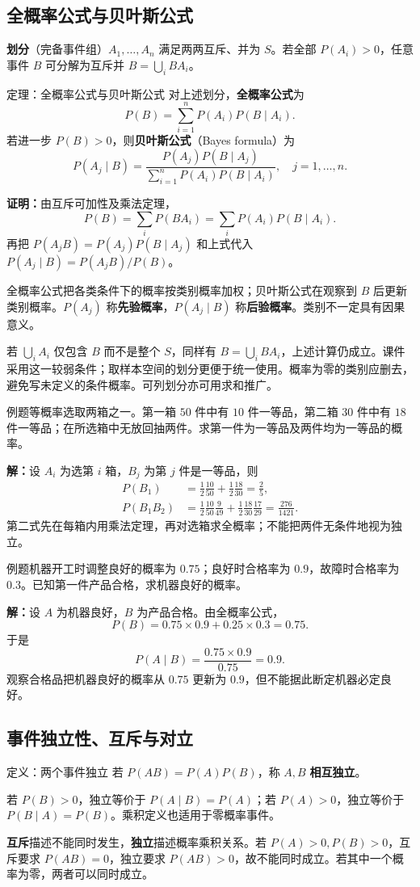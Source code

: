 \documentclass[UTF8,fontset=none,zihao=-4,a4paper]{ctexart}
\newcommand{\term}[1]{\textbf{#1}}
\newcommand{\example}[1]{\begin{infobox}{例题}#1\end{infobox}}
\newcommand{\solution}{\par\noindent\textbf{解：}}
\newcommand{\proof}{\par\noindent\textbf{证明：}}
\begin{document}
\subsection{全概率公式与贝叶斯公式}
\term{划分}（完备事件组）$A_1,\ldots,A_n$ 满足两两互斥、并为 $S$。若全部 $P(A_i)>0$，任意事件 $B$ 可分解为互斥并 $B=\bigcup_i BA_i$。
\begin{infobox}{定理：全概率公式与贝叶斯公式}
对上述划分，\term{全概率公式}为
\[
P(B)=\sum_{i=1}^n P(A_i)P(B\mid A_i).
\]
若进一步 $P(B)>0$，则\term{贝叶斯公式}（Bayes formula）为
\[
P(A_j\mid B)=\frac{P(A_j)P(B\mid A_j)}{\sum_{i=1}^n P(A_i)P(B\mid A_i)},\quad j=1,\ldots,n.
\]
\end{infobox}
\proof 由互斥可加性及乘法定理，
\[
P(B)=\sum_i P(BA_i)=\sum_i P(A_i)P(B\mid A_i).
\]
再把 $P(A_jB)=P(A_j)P(B\mid A_j)$ 和上式代入 $P(A_j\mid B)=P(A_jB)/P(B)$。

全概率公式把各类条件下的概率按类别概率加权；贝叶斯公式在观察到 $B$ 后更新类别概率。$P(A_j)$ 称\term{先验概率}，$P(A_j\mid B)$ 称\term{后验概率}。类别不一定具有因果意义。

若 $\bigcup_i A_i$ 仅包含 $B$ 而不是整个 $S$，同样有 $B=\bigcup_i BA_i$，上述计算仍成立。课件采用这一较弱条件；取样本空间的划分更便于统一使用。概率为零的类别应删去，避免写未定义的条件概率。可列划分亦可用求和推广。
\example{等概率选取两箱之一。第一箱 $50$ 件中有 $10$ 件一等品，第二箱 $30$ 件中有 $18$ 件一等品；在所选箱中无放回抽两件。求第一件为一等品及两件均为一等品的概率。}
\solution 设 $A_i$ 为选第 $i$ 箱，$B_j$ 为第 $j$ 件是一等品，则
\begin{align*}
P(B_1)&=\frac12\frac{10}{50}+\frac12\frac{18}{30}=\frac25,\\
P(B_1B_2)&=\frac12\frac{10}{50}\frac9{49}
+\frac12\frac{18}{30}\frac{17}{29}=\frac{276}{1421}.
\end{align*}
第二式先在每箱内用乘法定理，再对选箱求全概率；不能把两件无条件地视为独立。
\example{机器开工时调整良好的概率为 $0.75$；良好时合格率为 $0.9$，故障时合格率为 $0.3$。已知第一件产品合格，求机器良好的概率。}
\solution 设 $A$ 为机器良好，$B$ 为产品合格。由全概率公式，
\[
P(B)=0.75\times0.9+0.25\times0.3=0.75.
\]
于是
\[
P(A\mid B)=\frac{0.75\times0.9}{0.75}=0.9.
\]
观察合格品把机器良好的概率从 $0.75$ 更新为 $0.9$，但不能据此断定机器必定良好。
\subsection{事件独立性、互斥与对立}
\begin{infobox}{定义：两个事件独立}
若 $P(AB)=P(A)P(B)$，称 $A,B$ \term{相互独立}。

若 $P(B)>0$，独立等价于 $P(A\mid B)=P(A)$；若 $P(A)>0$，独立等价于 $P(B\mid A)=P(B)$。乘积定义也适用于零概率事件。
\end{infobox}
\term{互斥}描述不能同时发生，\term{独立}描述概率乘积关系。若 $P(A)>0,P(B)>0$，互斥要求 $P(AB)=0$，独立要求 $P(AB)>0$，故不能同时成立。若其中一个概率为零，两者可以同时成立。
\end{document}
